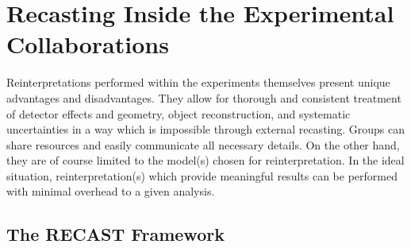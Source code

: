 \section{Recasting Inside the Experimental Collaborations}
\label{sec:ch5-recastingInsideExp}

Reinterpretations performed within the experiments themselves present unique advantages and disadvantages. They allow for thorough and consistent treatment of detector effects and geometry, object reconstruction, and systematic uncertainties in a way which is impossible through external recasting. Groups can share resources and easily communicate all necessary details. On the other hand, they are of course limited to the model(s) chosen for reinterpretation. In the ideal situation, reinterpretation(s) which provide meaningful results can be performed with minimal overhead to a given analysis.


\subsection{The RECAST Framework}
{}